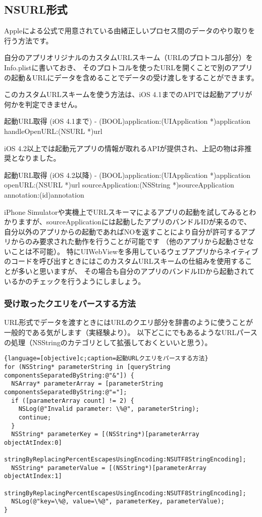 \documentclass[b5paper]{jsarticle}
\begin{document}
\subsection{NSURL形式}
Appleによる公式で用意されている由緒正しいプロセス間のデータのやり取りを行う方法です。

自分のアプリオリジナルのカスタムURLスキーム（URLのプロトコル部分）をInfo.plistに書いておき、
そのプロトコルを使ったURLを開くことで別のアプリの起動＆URLにデータを含めることでデータの受け渡しをすることができます。

このカスタムURLスキームを使う方法は、iOS 4.1までのAPIでは起動アプリが何かを判定できません。
\begin{itembox}{起動URL取得 (iOS 4.1まで)}
- (BOOL)application:(UIApplication *)application handleOpenURL:(NSURL *)url
\end{itembox}
iOS 4.2以上では起動元アプリの情報が取れるAPIが提供され、上記の物は非推奨となりました。
\begin{itembox}{起動URL取得 (iOS 4.2以降)}
- (BOOL)application:(UIApplication *)application openURL:(NSURL *)url sourceApplication:(NSString *)sourceApplication annotation:(id)annotation
\end{itembox}
iPhone Simulatorや実機上でURLスキーマによるアプリの起動を試してみるとわかりますが、sourceApplicationには起動したアプリのバンドルIDが来るので、
自分以外のアプリからの起動であればNOを返すことにより自分が許可するアプリからのみ要求された動作を行うことが可能です
（他のアプリから起動させないことは不可能）。
特にUIWebViewを多用しているウェブアプリからネイティブのコードを呼び出すときにはこのカスタムURLスキームの仕組みを使用することが多いと思いますが、
その場合も自分のアプリのバンドルIDから起動されているかのチェックを行うようにしましょう。

\subsubsection{受け取ったクエリをパースする方法}
URL形式でデータを渡すときにはURLのクエリ部分を辞書のように使うことが一般的である気がします（実経験より）。
以下どこにでもあるようなURLパースの処理（NSStringのカテゴリとして拡張しておくといいと思う）。
\begin{lstlisting}{language=[objective]c;caption=起動URLクエリをパースする方法}
for (NSString* parameterString in [queryString componentsSeparatedByString:@"&"]) {
  NSArray* parameterArray = [parameterString componentsSeparatedByString:@"="];
  if ([parameterArray count] != 2) {
	NSLog(@"Invalid parameter: \%@", parameterString);
	continue;
  }
  NSString* parameterKey = [(NSString*)[parameterArray objectAtIndex:0]
	stringByReplacingPercentEscapesUsingEncoding:NSUTF8StringEncoding];
  NSString* parameterValue = [(NSString*)[parameterArray objectAtIndex:1]
	stringByReplacingPercentEscapesUsingEncoding:NSUTF8StringEncoding];
  NSLog(@"key=\%@, value=\%@", parameterKey, parameterValue);
}
\end{lstlisting}
\end{document}
